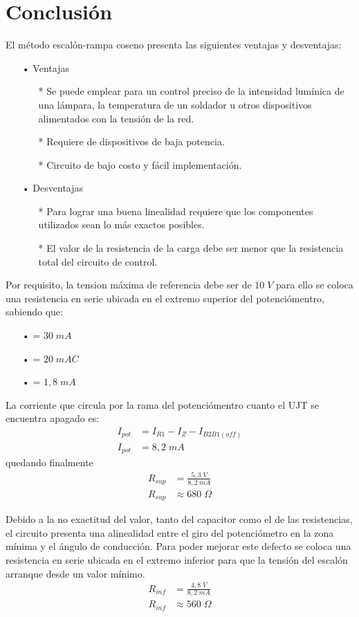 \documentclass{article}
\begin{document}
\clearpage
\section{Conclusión}
El método escalón-rampa coseno presenta las siguientes ventajas y desventajas:

\begin{itemize}
\item[•] Ventajas
	\begin{itemize}
		\item[*] Se puede emplear para un control preciso de la intensidad lumínica de una lámpara, la temperatura de un soldador u otros dispositivos alimentados con la tensión de la red.
		\item[*] Requiere de dispositivos de baja potencia.
		\item[*] Circuito de bajo costo y fácil implementación.
	\end{itemize}
\item[•] Desventajas
	\begin{itemize}
		\item[*] Para lograr una buena linealidad requiere que los componentes utilizados sean lo más exactos posibles.
		\item[*] El valor de la resistencia de la carga debe ser menor que la resistencia total del circuito de control.
	\end{itemize}
\end{itemize}

Por requisito, la tension máxima de referencia debe ser de $10 \; V$ para ello se coloca una resistencia en serie ubicada en el extremo superior del potenciómentro, sabiendo que:
\begin{itemize}\itemsep0em \itemindent=2em
	\item[•]{= $30 \; mA$}
	\item[•]{= $20 \; mAC$}
	\item[•]{= $1,8 \;  mA$}
\end{itemize}

La corriente que circula por la rama del potenciómentro cuanto el UJT se encuentra apagado es:
\begin{align*}
I_{pot} &= I_{R1} - I_Z - I_{B2B1(off)} \\
I_{pot} &= 8,2 \; mA
\end{align*}
quedando finalmente
\begin{align*}
R_{sup} &= \frac{5,3 \; V}{8,2 \; mA} \\
R_{sup} &\approx 680 \; \Omega
\end{align*}

Debido a la no exactitud del valor, tanto del capacitor como el de las resistencias, el circuito presenta una alinealidad entre el giro del potenciómetro en la zona mínima y el ángulo de conducción. Para poder mejorar este defecto se coloca una resistencia en serie ubicada en el extremo inferior para que la tensión del escalón arranque desde un valor mínimo.
\begin{align*}
R_{inf} &= \frac{4,8 \; V}{8,2 \; mA} \\
R_{inf} &\approx 560 \; \Omega
\end{align*}
\end{document}

